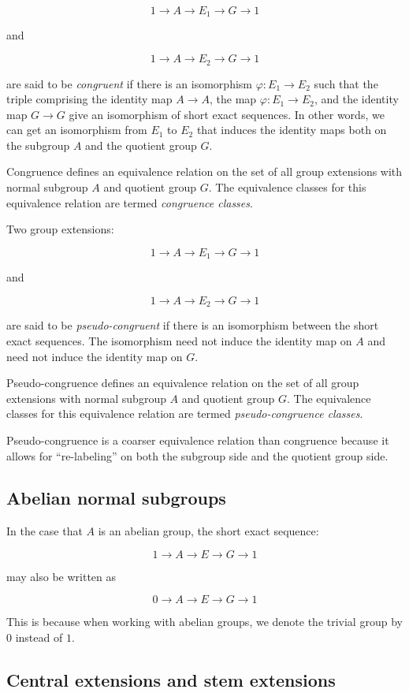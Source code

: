 \documentclass{ucetd}
\begin{document}
$$1 \to A \to E_1 \to G \to 1$$

and

$$1 \to A \to E_2 \to G \to 1$$

are said to be {\em congruent} if there is an isomorphism $\varphi:
E_1 \to E_2$ such that the triple comprising the identity map $A \to
A$, the map $\varphi:E_1 \to E_2$, and the identity map $G \to G$ give
an isomorphism of short exact sequences. In other words, we can get an
isomorphism from $E_1$ to $E_2$ that induces the identity maps both on
the subgroup $A$ and the quotient group $G$.

Congruence defines an equivalence relation on the set of all
group extensions with normal subgroup $A$ and quotient group $G$. The
equivalence classes for this equivalence relation are termed {\em
  congruence classes}. 

Two group extensions:

$$1 \to A \to E_1 \to G \to 1$$

and

$$1 \to A \to E_2 \to G \to 1$$

are said to be {\em pseudo-congruent} if there is an isomorphism
between the short exact sequences. The isomorphism need not induce the
identity map on $A$ and need not induce the identity map on $G$.

Pseudo-congruence defines an equivalence relation on the set of all
group extensions with normal subgroup $A$ and quotient group $G$. The
equivalence classes for this equivalence relation are termed {\em
  pseudo-congruence classes}.

Pseudo-congruence is a coarser equivalence relation than congruence
because it allows for ``re-labeling'' on both the subgroup side and
the quotient group side.

\subsection{Abelian normal subgroups}

In the case that $A$ is an abelian group, the short exact sequence:

$$1 \to A \to E \to G \to 1$$

may also be written as

$$0 \to A \to E \to G \to 1$$

This is because when working with abelian groups, we denote the
trivial group by $0$ instead of $1$.

\subsection{Central extensions and stem extensions}\label{sec:central-and-stem-extension}
\end{document}

